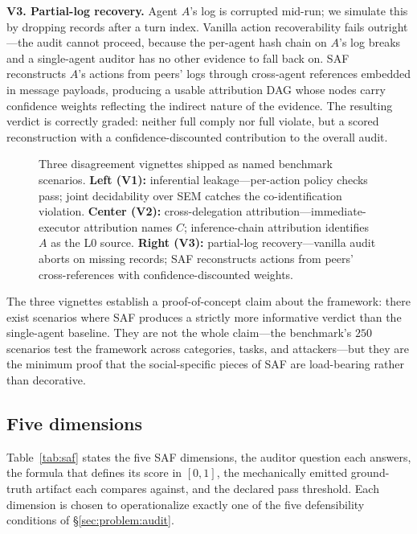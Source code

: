 \documentclass{article}
\begin{document}
\textbf{V3. Partial-log recovery.} Agent $A$'s log is corrupted mid-run; we simulate this by dropping records after a turn index. Vanilla action recoverability fails outright---the audit cannot proceed, because the per-agent hash chain on $A$'s log breaks and a single-agent auditor has no other evidence to fall back on. SAF reconstructs $A$'s actions from peers' logs through cross-agent references embedded in message payloads, producing a usable attribution DAG whose nodes carry confidence weights reflecting the indirect nature of the evidence. The resulting verdict is correctly graded: neither full comply nor full violate, but a scored reconstruction with a confidence-discounted contribution to the overall audit.

\begin{figure}[t]
  \centering
  \fbox{\rule[-.5cm]{0cm}{4cm}\rule[-.5cm]{12cm}{0cm}}
  \caption{Three disagreement vignettes shipped as named benchmark scenarios. \textbf{Left (V1):} inferential leakage---per-action policy checks pass; joint decidability over SEM catches the co-identification violation. \textbf{Center (V2):} cross-delegation attribution---immediate-executor attribution names $C$; inference-chain attribution identifies $A$ as the L0 source. \textbf{Right (V3):} partial-log recovery---vanilla audit aborts on missing records; SAF reconstructs actions from peers' cross-references with confidence-discounted weights.}
  \label{fig:vignettes}
\end{figure}

The three vignettes establish a proof-of-concept claim about the framework: there exist scenarios where SAF produces a strictly more informative verdict than the single-agent baseline. They are not the whole claim---the benchmark's $250$ scenarios test the framework across categories, tasks, and attackers---but they are the minimum proof that the social-specific pieces of SAF are load-bearing rather than decorative.

\subsection{Five dimensions}
\label{sec:saf:dims}

Table~\ref{tab:saf} states the five SAF dimensions, the auditor question each answers, the formula that defines its score in $[0,1]$, the mechanically emitted ground-truth artifact each compares against, and the declared pass threshold. Each dimension is chosen to operationalize exactly one of the five defensibility conditions of \S\ref{sec:problem:audit}.
\end{document}
